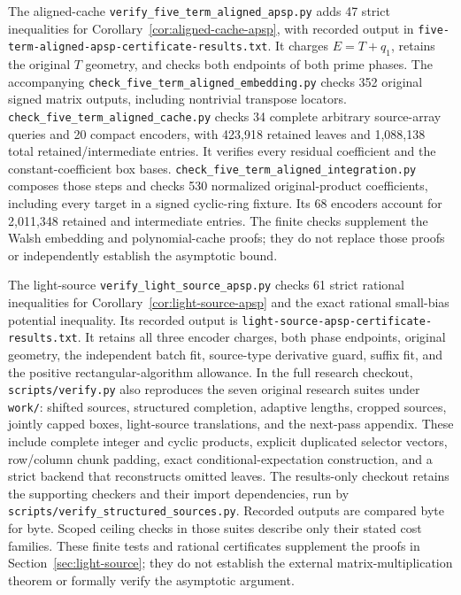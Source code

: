 \documentclass[11pt]{article}
\begin{document}
The aligned-cache \texttt{verify\_five\_term\_aligned\_apsp.py} adds 47
strict inequalities for Corollary~\ref{cor:aligned-cache-apsp}, with
recorded output in \texttt{five-term-aligned-apsp-certificate-results.txt}.
It charges $E=T+q_1$, retains the original $T$ geometry, and checks both
endpoints of both prime phases. The accompanying
\texttt{check\_five\_term\_aligned\_embedding.py} checks 352 original
signed matrix outputs, including nontrivial transpose locators.
\texttt{check\_five\_term\_aligned\_cache.py} checks 34 complete arbitrary
source-array queries and 20 compact encoders, with 423,918 retained
leaves and 1,088,138 total retained/intermediate entries. It verifies every residual
coefficient and the constant-coefficient box bases.
\texttt{check\_five\_term\_aligned\_integration.py} composes those steps
and checks 530 normalized original-product coefficients, including
every target in a signed cyclic-ring fixture. Its 68 encoders account
for 2,011,348 retained and intermediate entries. The finite checks
supplement the Walsh embedding and polynomial-cache proofs; they do
not replace those proofs or independently establish the asymptotic bound.

The light-source \texttt{verify\_light\_source\_apsp.py} checks 61
strict rational inequalities for Corollary~\ref{cor:light-source-apsp}
and the exact rational small-bias potential inequality. Its recorded
output is \texttt{light-source-\allowbreak apsp-\allowbreak certificate-\allowbreak results.txt}.
It retains all three encoder charges, both phase endpoints, original
geometry, the independent batch fit, source-type derivative guard,
suffix fit, and the positive rectangular-algorithm allowance.
In the full research checkout, \texttt{scripts/verify.py} also reproduces
the seven original research suites under \texttt{work/}: shifted sources, structured
completion, adaptive lengths, cropped sources, jointly capped boxes,
light-source translations, and the next-pass appendix. These include
complete integer and cyclic products, explicit duplicated selector
vectors, row/column chunk padding, exact conditional-expectation
construction, and a strict backend that reconstructs omitted leaves.
The results-only checkout retains the supporting checkers and their
import dependencies, run by \texttt{scripts/verify\_structured\_sources.py}.
Recorded outputs are compared byte for byte. Scoped ceiling checks
in those suites describe only their stated cost families.
These finite tests and rational certificates supplement the proofs
in Section~\ref{sec:light-source}; they do not establish the external
matrix-multiplication theorem or formally verify the asymptotic argument.
\end{document}
